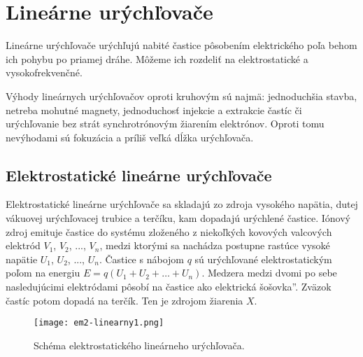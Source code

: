 \documentclass[../../main.tex]{subfiles}
\begin{document}
\section{Lineárne urýchľovače}

Lineárne urýchľovače urýchľujú nabité častice pôsobením elektrického poľa behom ich pohybu po priamej dráhe. Môžeme ich rozdeliť na elektrostatické a vysokofrekvenčné. 

Výhody lineárnych urýchľovačov oproti kruhovým sú najmä: jednoduchšia stavba, netreba mohutné magnety, jednoduchosť injekcie a extrakcie častíc či urýchľovanie bez strát synchrotrónovým žiarením elektrónov. Oproti tomu nevýhodami sú fokuzácia a príliš veľká dĺžka urýchľovača.

\subsection{Elektrostatické lineárne urýchľovače}

Elektrostatické lineárne urýchľovače sa skladajú zo zdroja vysokého napätia, dutej vákuovej urýchľovacej trubice a terčíku, kam dopadajú urýchlené častice. Iónový zdroj emituje častice do systému zloženého z niekoľkých kovových valcových elektród $V_1$, $V_2$, ..., $V_n$, medzi ktorými sa nachádza postupne rastúce vysoké napätie $U_1$, $U_2$, ..., $U_n$. Častice s nábojom $q$ sú urýchľované elektrostatickým poľom na energiu $E=q(U_1+U_2+\ldots+U_n)$. Medzera medzi dvomi po sebe nasledujúcimi elektródami pôsobí na častice ako \quotedblbase elektrická šošovka\textquotedblright . Zväzok častíc potom dopadá na terčík. Ten je zdrojom žiarenia $X$.

\begin{figure}[h]
\centering
\texttt{[image: em2-linearny1.png]}
\caption{Schéma elektrostatického lineárneho urýchľovača.}
\label{em2:img:linearny1}
\end{figure}
\end{document}
